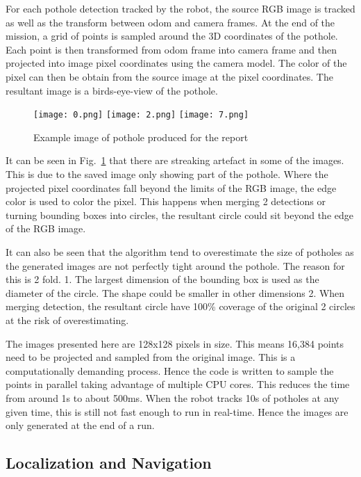\documentclass[conference]{IEEEtran}
\begin{document}
For each pothole detection tracked by the robot, the source RGB image is tracked as well as the transform between odom and camera frames. At the end of the mission, a grid of points is sampled around the 3D coordinates of the pothole. Each point is then transformed from odom frame into camera frame and then projected into image pixel coordinates using the camera model. The color of the pixel can then be obtain from the source image at the pixel coordinates. The resultant image is a birds-eye-view of the pothole.

\begin{figure}[ht]
    \centering
    \texttt{[image: 0.png]}
    \texttt{[image: 2.png]}
    \texttt{[image: 7.png]}
    \caption{Example image of pothole produced for the report}
    \label{fig:pothole_image}
\end{figure}

It can be seen in Fig.~\ref{fig:pothole_image} that there are streaking artefact in some of the images. This is due to the saved image only showing part of the pothole. Where the projected pixel coordinates fall beyond the limits of the RGB image, the edge color is used to color the pixel. This happens when merging 2 detections or turning bounding boxes into circles, the resultant circle could sit beyond the edge of the RGB image.

It can also be seen that the algorithm tend to overestimate the size of potholes as the generated images are not perfectly tight around the pothole. The reason for this is 2 fold. 1. The largest dimension of the bounding box is used as the diameter of the circle. The shape could be smaller in other dimensions 2. When merging detection, the resultant circle have 100\% coverage of the original 2 circles at the risk of overestimating.

The images presented here are 128x128 pixels in size. This means 16,384 points need to be projected and sampled from the original image. This is a computationally demanding process. Hence the code is written to sample the points in parallel taking advantage of multiple CPU cores. This reduces the time from around 1s to about 500ms. When the robot tracks 10s of potholes at any given time, this is still not fast enough to run in real-time. Hence the images are only generated at the end of a run.

\subsection{Localization and Navigation}
\end{document}
